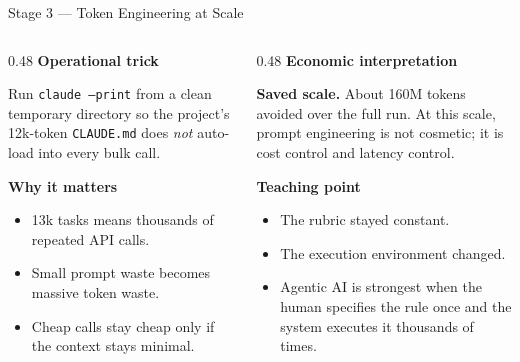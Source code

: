 \documentclass[10pt,english,aspectratio=169]{beamer}
\begin{document}
\begin{frame}{Stage 3 --- Token Engineering at Scale}
\begin{columns}[T]
\begin{column}{0.48\textwidth}
\textbf{Operational trick}
\begin{tcolorbox}[colback=gray!5,colframe=gray!40]\scriptsize
Run \texttt{claude --print} from a clean temporary directory so the project's 12k-token \texttt{CLAUDE.md} does \emph{not} auto-load into every bulk call.
\end{tcolorbox}

\vspace{0.12cm}
\textbf{Why it matters}
\begin{itemize}\scriptsize
  \item 13k tasks means thousands of repeated API calls.
  \item Small prompt waste becomes massive token waste.
  \item Cheap calls stay cheap only if the context stays minimal.
\end{itemize}
\end{column}
\begin{column}{0.48\textwidth}
\textbf{Economic interpretation}
\begin{tcolorbox}[colback=blue!3,colframe=RedTitle!60]\scriptsize
\textbf{Saved scale.} About 160M tokens avoided over the full run. At this scale, prompt engineering is not cosmetic; it is cost control and latency control.
\end{tcolorbox}

\vspace{0.12cm}
\textbf{Teaching point}
\begin{itemize}\scriptsize
  \item The rubric stayed constant.
  \item The execution environment changed.
  \item Agentic AI is strongest when the human specifies the rule once and the system executes it thousands of times.
\end{itemize}
\end{column}
\end{columns}
\end{frame}
\end{document}
